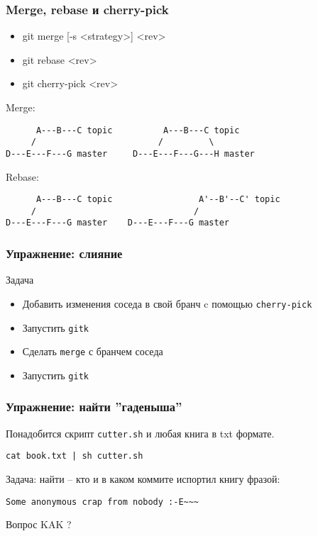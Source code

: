 \begin{frame}[fragile]
	\frametitle{Merge, rebase и cherry-pick}

	\begin{itemize}
		\item git merge [-s <strategy>] <rev>
		\item git rebase <rev> 
		\item git cherry-pick <rev> 
	\end{itemize}

	Merge:

	\begin{verbatim}
      A---B---C topic          A---B---C topic
     /                        /         \
D---E---F---G master     D---E---F---G---H master
	\end{verbatim}

	Rebase:

	\begin{verbatim}
      A---B---C topic                 A'--B'--C' topic
     /                               /         
D---E---F---G master    D---E---F---G master
	\end{verbatim}

\end{frame}


\begin{frame}[fragile]
	\frametitle{Упражнение: слияние}

		   
	\begin{block}{Задача}
		\begin{itemize}
			\item Добавить изменения соседа в свой бранч c помощью {\tt cherry-pick} 
			\item Запустить {\tt gitk}
			\item Сделать {\tt merge} с бранчем соседа
			\item Запустить {\tt gitk}
		\end{itemize}
	\end{block}
\end{frame}


\begin{frame}[fragile]
	\frametitle{Упражнение: найти ''гаденыша''}

	Понадобится скрипт {\tt cutter.sh} и любая книга в txt формате.

	\begin{verbatim}
cat book.txt | sh cutter.sh
	\end{verbatim}

	Задача: найти -- кто и в каком коммите испортил книгу фразой:
	\begin{verbatim}
Some anonymous crap from nobody :-E~~~
	\end{verbatim}
	
	\begin{block}{Вопрос}
		\Large{KAK ?}
	\end{block}
\end{frame}

